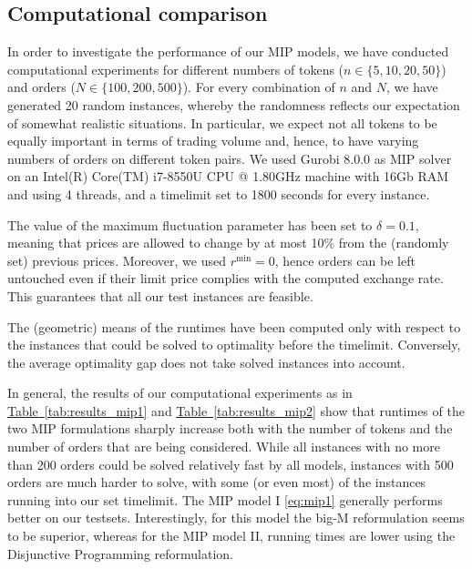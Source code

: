 \documentclass[11pt,parskip=full]{scrartcl}%
\newcommand*{\wrt}{with respect to }
\newcommand*{\Min}{\mathrm{min}}
\newcommand*{\tabref}[1]{\hyperref[{#1}]{Table~\ref*{#1}}}
\begin{document}
\newpage
\subsection{Computational comparison}
\label{subsec:computational_comparison}

In order to investigate the performance of our MIP models, we have conducted computational
experiments for different numbers of tokens ($ n \in \{5,10,20,50\} $) and orders ($ N \in 
\{100,200,500\} $).
For every combination of $ n $ and $ N $, we have generated 20 random instances, whereby the
randomness reflects our expectation of somewhat realistic situations.
In particular, we expect not all tokens to be equally important in terms of trading volume and,
hence, to have varying numbers of orders on different token pairs.
We used Gurobi 8.0.0 as MIP solver on an Intel(R) Core(TM) i7-8550U CPU @ 1.80GHz machine with 16Gb
RAM and using 4 threads, and a timelimit set to 1800 seconds for every instance.

The value of the maximum fluctuation parameter has been set to $ \delta = 0.1 $, meaning that
prices are allowed to change by at most 10\% from the (randomly set) previous prices.
Moreover, we used $ r^\Min = 0 $, hence orders can be left untouched even if their limit price
complies with the computed exchange rate.
This guarantees that all our test instances are feasible.

The (geometric) means of the runtimes have been computed only \wrt the instances that could be
solved to optimality before the timelimit. Conversely, the average optimality gap does not take
solved instances into account.

In general, the results of our computational experiments as in \tabref{tab:results_mip1} and 
\tabref{tab:results_mip2} show that runtimes of the two MIP formulations sharply increase both with
the number of tokens and the number of orders that are being considered.
While all instances with no more than 200 orders could be solved relatively fast by all models,
instances with 500 orders are much harder to solve, with some (or even most) of the instances
running into our set timelimit.
The MIP model I \eqref{eq:mip1} generally performs better on our testsets.
Interestingly, for this model the big-M reformulation seems to be superior, whereas for the MIP
model II, running times are lower using the Disjunctive Programming reformulation.
\end{document}
